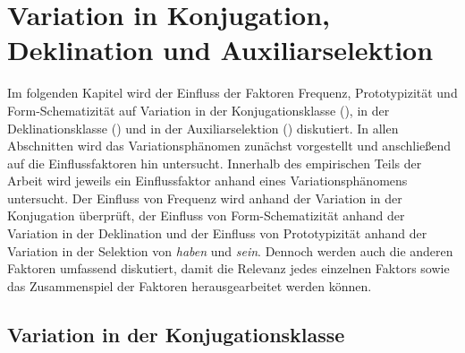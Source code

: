 \chapter{Variation in Konjugation, Deklination und Auxiliarselektion}\label{Fallstudien}
\begin{sloppypar}
Im folgenden Kapitel wird der Einfluss der Faktoren Frequenz, Prototypizität und Form-Schematizität auf Variation in der Konjugationsklasse (), in der Deklinationsklasse () und in der Auxiliarselektion () diskutiert. In allen Abschnitten wird das Variationsphänomen zunächst vorgestellt und anschließend auf die Einflussfaktoren hin untersucht. Innerhalb des empirischen Teils der Arbeit wird jeweils ein Einflussfaktor anhand eines Variations\-phänomens untersucht. Der Einfluss von Frequenz wird anhand der Variation in der Konjugation überprüft, der Einfluss von Form-Schematizität anhand der Variation in der Deklination und der Einfluss von Prototypizität anhand der Variation in der Selektion von \textit{haben} und \textit{sein}. Dennoch werden auch die anderen Faktoren umfassend diskutiert, damit die Relevanz jedes einzelnen Faktors sowie das Zusammenspiel der Faktoren herausgearbeitet werden können.
\end{sloppypar}

\section{Variation in der Konjugationsklasse}
\label{konjugation}

